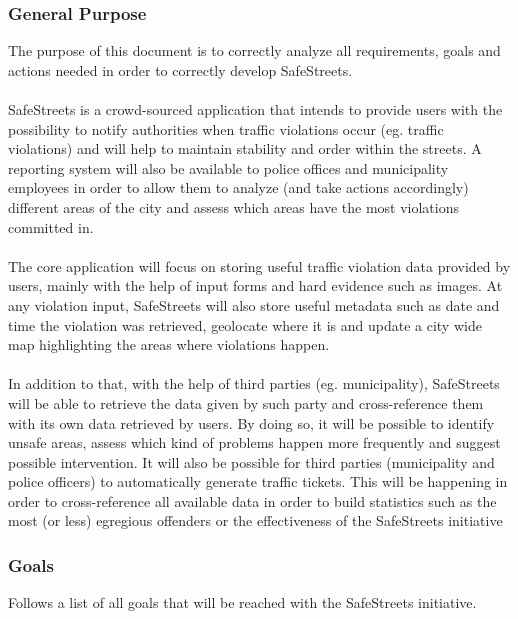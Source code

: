 \documentclass{article}
\begin{document}
\subsubsection{General Purpose}
    The purpose of this document is to correctly analyze all requirements, goals
    and actions needed in order to correctly develop SafeStreets.\\
    \\
    SafeStreets is a crowd-sourced application that intends to provide users
    with the possibility to notify authorities when traffic violations occur
    (eg. traffic violations) and will help to maintain stability and order
    within the streets. A reporting system will also be available to police
    offices and municipality employees in order to allow them to analyze (and
    take actions accordingly) different areas of the city and assess which areas
    have the most violations committed in.\\
    \\
    The core application will focus on storing useful traffic violation data
    provided by users, mainly with the help of input forms and hard evidence
    such as images. At any violation input, SafeStreets will also store useful
    metadata such as date and time the violation was retrieved, geolocate where
    it is and update a city wide map highlighting the areas where violations
    happen.\\
    \\
    In addition to that, with the help of third parties (eg. municipality),
    SafeStreets will be able to retrieve the data given by such party and
    cross-reference them with its own data retrieved by users. By doing so, it
    will be possible to identify unsafe areas, assess which kind of problems
    happen more frequently and suggest possible intervention. It will also be
    possible for third parties (municipality and police officers) to
    automatically generate traffic tickets. This will be happening in order to
    cross-reference all available data in order to build statistics such as the
    most (or less) egregious offenders or the effectiveness of the SafeStreets
    initiative \subsubsection{Goals} Follows a list of all goals that will be
    reached with the SafeStreets initiative.
\end{document}

